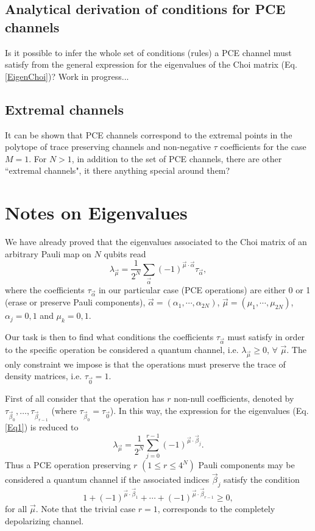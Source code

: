 \subsection{Analytical derivation of conditions for PCE channels}
% 
Is it possible to infer the whole set of conditions (rules) a PCE channel must satisfy from the general expression for the eigenvalues of the Choi matrix (Eq. \ref{EigenChoi})? Work in progress...

% 
\subsection{Extremal channels}
% 
It can be shown that PCE channels correspond to the extremal points in the polytope of trace preserving channels and non-negative $\tau$ coefficients for the case $M=1$. For $N>1$, in addition to the set of PCE channels, there are other  ``extremal channels", it there anything special around them?


\section{Notes on Eigenvalues}
% 
We have already proved that the eigenvalues associated to the Choi matrix of an arbitrary Pauli map on $N$ qubits read
% 
\begin{equation}
 \lambda_{\vec{\mu}}=\frac{1}{2^N}\sum_{\vec{\alpha}}(-1)^{\vec{\mu}\cdot\vec{\alpha}}\tau_{\vec{\alpha}}, 
 \label{Eq1}
\end{equation}
% 
where the coefficients $\tau_{\vec{\alpha}}$ in our particular case (PCE operations) are either 0 or 1 (erase or preserve Pauli components), $\vec{\alpha}=(\alpha_1,\cdots,\alpha_{2N})$, $\vec{\mu}=(\mu_1,\cdots,\mu_{2N})$, $\alpha_j=0,1$ and $\mu_k=0,1$.

Our task is then to find what conditions the coefficients $\tau_{\vec{\alpha}}$ must satisfy in order to the specific operation be considered a quantum channel, i.e. $\lambda_{\vec{\mu}}\geq 0$, $\forall$ $\vec{\mu}$. The only constraint we impose is that the operations must preserve the trace of density matrices, i.e. $\tau_{\vec{0}}=1$.

First of all consider that the operation has $r$ non-null coefficients, denoted by $\tau_{\vec{\beta}_0},\dots,\tau_{\vec{\beta}_{r-1}}$ (where $\tau_{\vec{\beta}_0}=\tau_{\vec{0}}$). In this way, the expression for the eigenvalues (Eq. \ref{Eq1}) is reduced to
% 
\begin{equation}
 \lambda_{\vec{\mu}}=\frac{1}{2^N}\sum_{j=0}^{r-1}(-1)^{\vec{\mu}\cdot\vec{\beta}_j}.
 \label{Eq2}
 \end{equation}
% 
Thus a PCE operation preserving $r$ $\left(1\leq r \leq 4^N\right)$ Pauli components may be considered a quantum channel if the associated indices $\vec{\beta}_j$ satisfy the condition
% 
\begin{equation}
 1+(-1)^{\vec{\mu}\cdot\vec{\beta}_1}+\cdots+(-1)^{\vec{\mu}\cdot\vec{\beta}_{r-1}}\geq 0,
 \label{Eq3}
 \end{equation}
% 
for all $\vec{\mu}$. Note that the trivial case $r=1$, corresponds to the completely depolarizing channel. 

